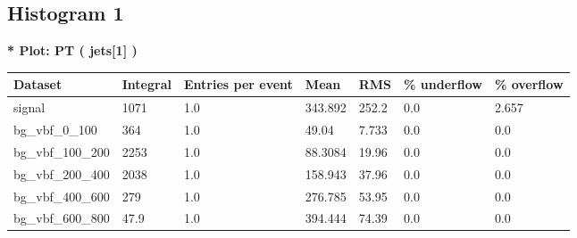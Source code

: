 \documentclass[a4paper, 10pt]{article}
\begin{document}
   \newpage
\subsection{ Histogram 1}

\textbf{* Plot: PT ( jets[1] ) }\\
   \begin{table}[H]
  \begin{center}
    \begin{tabular}{|m{23.0mm}|m{23.0mm}|m{18.0mm}|m{19.0mm}|m{19.0mm}|m{19.0mm}|m{19.0mm}|}
      \hline
      {\cellcolor{yellow}         Dataset}& {\cellcolor{yellow}         Integral}& {\cellcolor{yellow}         Entries per event}& {\cellcolor{yellow}         Mean}& {\cellcolor{yellow}         RMS}& {\cellcolor{yellow}         \% underflow}& {\cellcolor{yellow}         \% overflow}\\
      \hline
      {\cellcolor{white}         signal}& {\cellcolor{white}         1071}& {\cellcolor{white}         1.0}& {\cellcolor{white}         343.892}& {\cellcolor{white}         252.2}& {\cellcolor{green}         0.0}& {\cellcolor{green}         2.657}\\
      \hline
      {\cellcolor{white}         bg\_vbf\_0\_100}& {\cellcolor{white}         364}& {\cellcolor{white}         1.0}& {\cellcolor{white}         49.04}& {\cellcolor{white}         7.733}& {\cellcolor{green}         0.0}& {\cellcolor{green}         0.0}\\
      \hline
      {\cellcolor{white}         bg\_vbf\_100\_200}& {\cellcolor{white}         2253}& {\cellcolor{white}         1.0}& {\cellcolor{white}         88.3084}& {\cellcolor{white}         19.96}& {\cellcolor{green}         0.0}& {\cellcolor{green}         0.0}\\
      \hline
      {\cellcolor{white}         bg\_vbf\_200\_400}& {\cellcolor{white}         2038}& {\cellcolor{white}         1.0}& {\cellcolor{white}         158.943}& {\cellcolor{white}         37.96}& {\cellcolor{green}         0.0}& {\cellcolor{green}         0.0}\\
      \hline
      {\cellcolor{white}         bg\_vbf\_400\_600}& {\cellcolor{white}         279}& {\cellcolor{white}         1.0}& {\cellcolor{white}         276.785}& {\cellcolor{white}         53.95}& {\cellcolor{green}         0.0}& {\cellcolor{green}         0.0}\\
      \hline
      {\cellcolor{white}         bg\_vbf\_600\_800}& {\cellcolor{white}         47.9}& {\cellcolor{white}         1.0}& {\cellcolor{white}         394.444}& {\cellcolor{white}         74.39}& {\cellcolor{green}         0.0}& {\cellcolor{green}         0.0}\\

\end{tabular}
\end{center}
\end{table}
\end{document}
